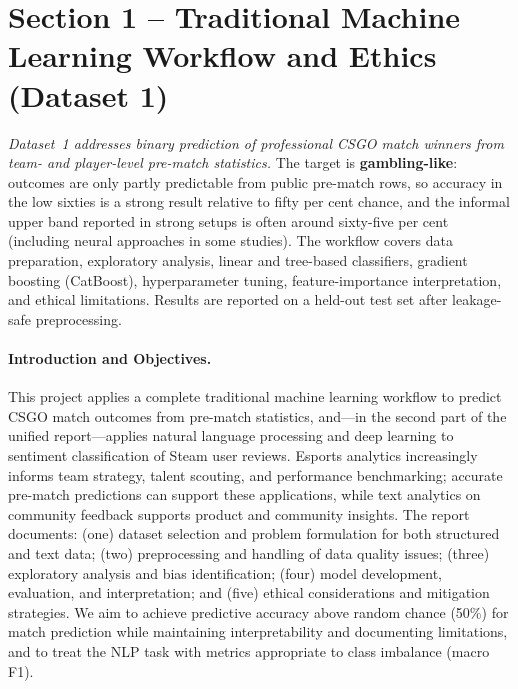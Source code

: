 \documentclass[12pt,a4paper]{article}
\begin{document}
\section{Section 1 -- Traditional Machine Learning Workflow and Ethics (Dataset 1)}

\noindent\textit{Dataset~1 addresses binary prediction of professional CSGO match winners from team- and player-level pre-match statistics.} The target is \textbf{gambling-like}: outcomes are only partly predictable from public pre-match rows, so accuracy in the low sixties is a strong result relative to fifty per cent chance, and the informal upper band reported in strong setups is often around sixty-five per cent (including neural approaches in some studies). The workflow covers data preparation, exploratory analysis, linear and tree-based classifiers, gradient boosting (CatBoost), hyperparameter tuning, feature-importance interpretation, and ethical limitations. Results are reported on a held-out test set after leakage-safe preprocessing.

\paragraph{Introduction and Objectives.}
This project applies a complete traditional machine learning workflow to predict CSGO match outcomes from pre-match statistics, and---in the second part of the unified report---applies natural language processing and deep learning to sentiment classification of Steam user reviews. Esports analytics increasingly informs team strategy, talent scouting, and performance benchmarking; accurate pre-match predictions can support these applications, while text analytics on community feedback supports product and community insights. The report documents: (one) dataset selection and problem formulation for both structured and text data; (two) preprocessing and handling of data quality issues; (three) exploratory analysis and bias identification; (four) model development, evaluation, and interpretation; and (five) ethical considerations and mitigation strategies. We aim to achieve predictive accuracy above random chance (50\%) for match prediction while maintaining interpretability and documenting limitations, and to treat the NLP task with metrics appropriate to class imbalance (macro F1).
\end{document}
